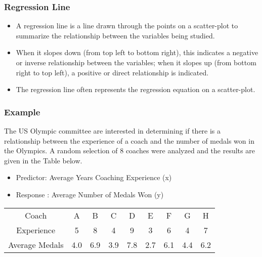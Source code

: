 \documentclass[a4]{beamer}
\begin{document}
\begin{frame}
\frametitle{Regression Line}
\begin{itemize}
\item A regression line is a line drawn through the points on a scatter-plot to summarize the relationship between the variables being studied.\item When it slopes down (from top left to bottom right), this indicates a negative or inverse relationship between the variables; when it slopes up (from bottom right to top left), a positive or direct relationship is indicated.

\item The regression line often represents the regression equation on a scatter-plot.
\end{itemize}
\end{frame}

\begin{frame}
\frametitle{Example}

The US Olympic committee are interested in determining if there is a relationship between the experience of a coach and the number of medals won in the Olympics. A random selection of 8 coaches were analyzed and the results are given in the Table below.
\begin{itemize}
\item Predictor: Average Years Coaching Experience (x)	
\item Response : Average Number of Medals Won (y)
\end{itemize}
\begin{center}

\begin{tabular}{|c|c|c|c|c|c|c|c|c|}
  \hline
  Coach & A & B & C & D & E & F & G & H \\
  Experience & 5 & 8 & 4 & 9 & 3 & 6 & 4 & 7\\
  Average Medals &4.0 & 6.9&3.9&7.8&2.7&6.1&4.4&6.2\\
  \hline
\end{tabular}
\end{center}
\end{frame}
\end{document}

